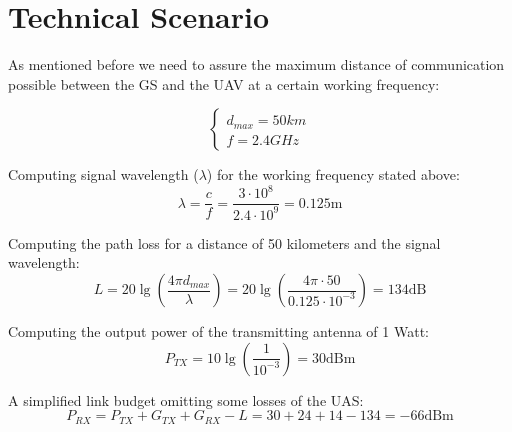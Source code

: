 \section{Technical Scenario}\label{sec:tech}

As mentioned before we need to assure the maximum distance of communication possible between the GS and the UAV at a certain working frequency:

\begin{equation*}\label{eq:tech_parameters1} 
 	\begin{cases}
 		d_{max} = 50 km	\\
 		f = 2.4 GHz
 	\end{cases}
\end{equation*}

Computing signal wavelength ($\lambda$) for the working frequency stated above:
\begin{equation*}\label{eq:tech_parameters2}
	\lambda = \frac{c}{f} = \frac{3\cdot 10^{8}}{2.4\cdot 10^{9}} 
	        = 0.125 \text{m}
\end{equation*}

Computing the path loss for a distance of 50 kilometers and the signal wavelength:
\begin{equation*}\label{eq:tech_parameters3}
	L = 20\lg\left (\frac{4\pi d_{max}}{\lambda} \right)
	  = 20\lg\left (\frac{4\pi \cdot 50}{0.125\cdot 10^{-3}} \right)
	  = 134 \text{dB} 
\end{equation*}

Computing the output power of the transmitting antenna of 1 Watt:
\begin{equation*}\label{eq:tech_parameters4}
	P_{TX} = 10\lg\left (\frac{1}{10^{-3}} \right)  
	       = 30 \text{dBm}
\end{equation*}


A simplified link budget omitting some losses of the UAS:
\begin{equation*}\label{eq:tech_parameters5}
	P_{RX} = P_{TX} + G_{TX} + G_{RX} - L  
	       = 30 + 24 + 14 - 134 = -66 \text{dBm}
\end{equation*}